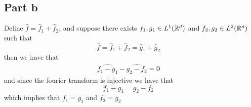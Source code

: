 \documentclass[12pt]{report}
\begin{document}
\subsection*{Part b}
Define $\hat{f} = \hat{f}_1 + \hat{f}_2$, and suppose there exists $f_1,g_1 \in L^1(\mathbb{R}^d)$ and $f_2,g_2 \in L^2(\mathbb{R}^d)$ such that
\begin{equation*}
    \hat{f} = \hat{f}_1 + \hat{f}_2 = \hat{g}_1 + \hat{g}_2
\end{equation*}
then we have that
\begin{align*}
    \widehat{f_1 - g_1} - \widehat{g_2 - f_2} = 0
\end{align*}
and since the fourier transform is injective we have that
\begin{equation*}
    f_1 - g_1 = g_2 - f_2
\end{equation*}
which implies that $f_1 = g_1$ and $f_2 = g_2$
\end{document}
